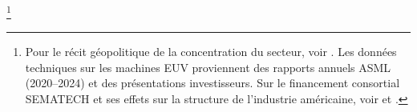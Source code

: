 %
%



\footnote{Pour le récit géopolitique de la concentration du secteur, voir \textcite{miller_chip_2022}. Les données techniques sur les machines EUV proviennent des rapports annuels ASML (2020--2024) et des présentations investisseurs. Sur le financement consortial SEMATECH et ses effets sur la structure de l'industrie américaine, voir \textcite{irwin_learning_1994} et \textcite{flamm_targeting_1987}.}


%



